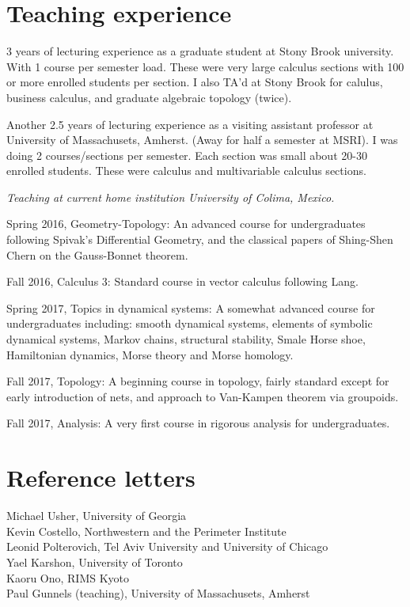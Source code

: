 \documentclass[overlapped,line,letterpaper]{res}
\begin{document}
\begin{resume}
 \section {\sc Teaching experience}
3 years of lecturing experience as a graduate student at Stony
Brook university. With 1 course per semester load. These were
very large calculus sections with 100 or more enrolled students
per section.  I also TA'd at Stony Brook for calulus, business
calculus, and graduate algebraic topology (twice). 


Another 2.5 years of lecturing experience as a visiting
assistant professor at University of Massachusets, Amherst.  (Away for half a
semester at MSRI).
I was doing 2 courses/sections per semester. Each section was
small about 20-30 enrolled students. 
These were calculus and multivariable calculus sections.


\emph{Teaching at current home institution University of Colima, Mexico.}

Spring 2016, Geometry-Topology: An advanced course for undergraduates following
Spivak's Differential Geometry, and the classical papers of Shing-Shen Chern on
the Gauss-Bonnet theorem.

Fall 2016, Calculus 3: Standard course in vector calculus following Lang.

Spring 2017, Topics in dynamical systems: A somewhat advanced course for
undergraduates including: smooth dynamical systems, elements of
symbolic dynamical systems, Markov chains, structural stability, Smale Horse
shoe, Hamiltonian dynamics, Morse theory
and Morse homology.

Fall 2017, Topology: A beginning course in topology, fairly standard except for
early introduction of nets, and approach to Van-Kampen theorem via groupoids.

Fall 2017, Analysis: A very first course in rigorous analysis for
undergraduates.
\section {\sc Reference letters}
Michael Usher, University of Georgia \\
Kevin Costello, Northwestern and the Perimeter Institute \\ 
Leonid Polterovich, Tel Aviv University and University of Chicago \\
Yael Karshon, University of Toronto \\
Kaoru Ono, RIMS Kyoto \\
Paul Gunnels (teaching), University of Massachusets, Amherst \\
 \end{resume}
 
\end{document}

